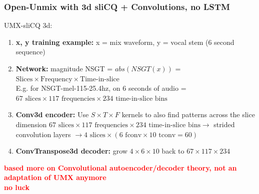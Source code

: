 \documentclass[usenames,dvipsnames]{beamer}
\begin{document}
\begin{frame}
	\frametitle{Open-Unmix with 3d sliCQ + Convolutions, no LSTM}
	UMX-sliCQ 3d:
	\begin{enumerate}
		\item
			\textbf{x, y training example:} x = mix waveform, y = vocal stem (6 second sequence)
		\item
			\textbf{Network:} magnitude NSGT = $abs(NSGT(x))$ = $\text{Slices} \times \text{Frequency} \times \text{Time-in-slice}$\\E.g. for NSGT-mel-115-25.4hz, on 6 seconds of audio = $67 \text{ slices} \times 117 \text{ frequencies} \times 234 \text{ time-in-slice bins} $
		\item
			\textbf{Conv3d encoder:} Use $S \times T \times F$ kernels to also find patterns across the slice dimension
			$67 \text{ slices} \times 117 \text{ frequencies} \times 234 \text{ time-in-slice bins} \rightarrow$ strided convolution layers $\rightarrow 4 \text{ slices} \times (6 \text { fconv} \times 10 \text { tconv} = 60)$\\
		\item
			\textbf{ConvTranspose3d decoder:} grow $4 \times 6 \times 10$ back to $67 \times 117 \times 234$
	\end{enumerate}
	\textbf{\textcolor{red}{based more on Convolutional autoencoder/decoder theory, not an adaptation of UMX anymore}}\\
	\textbf{\textcolor{red}{no luck}}\\
\end{frame}
\end{document}
